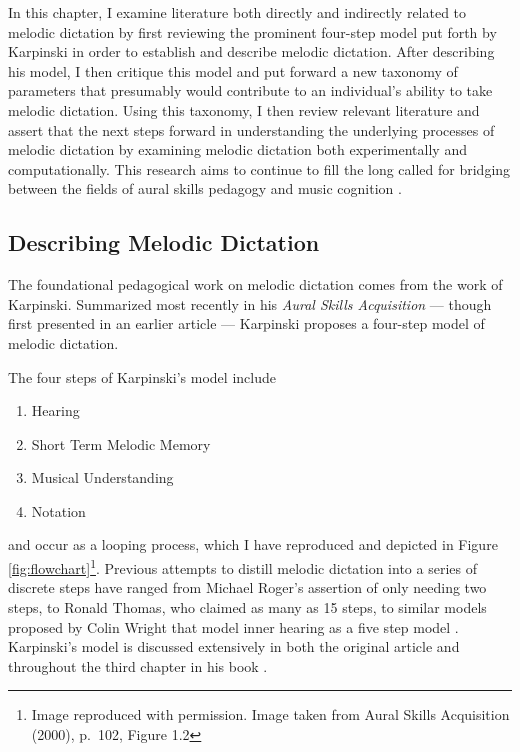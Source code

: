 \documentclass[12pt,]{book}
\providecommand{\tightlist}{%
  \setlength{\itemsep}{0pt}\setlength{\parskip}{0pt}}
\let\rmarkdownfootnote\footnote%
\def\footnote{\protect\rmarkdownfootnote}
\begin{document}
In this chapter, I examine literature both directly and indirectly related to melodic dictation by first reviewing the prominent four-step model put forth by Karpinski in order to establish and describe melodic dictation.
After describing his model, I then critique this model and put forward a new taxonomy of parameters that presumably would contribute to an individual's ability to take melodic dictation.
Using this taxonomy, I then review relevant literature and assert that the next steps forward in understanding the underlying processes of melodic dictation by examining melodic dictation both experimentally and computationally.
This research aims to continue to fill the long called for bridging between the fields of aural skills pedagogy and music cognition \citep{davidbutlerWhyGulfMusic1997a, karpinskiAuralSkillsAcquisition2000, klonoskiPerceptualLearningHierarchy2000}.

\hypertarget{describing-melodic-dictation}{%
\subsection{Describing Melodic Dictation}\label{describing-melodic-dictation}}

The foundational pedagogical work on melodic dictation comes from the work of Karpinski.
Summarized most recently in his \emph{Aural Skills Acquisition} \citep{karpinskiAuralSkillsAcquisition2000}--- though first presented in an earlier article \citep{karpinskiModelMusicPerception1990}--- Karpinski proposes a four-step model of melodic dictation.

The four steps of Karpinski's model include

\begin{enumerate}
\def\labelenumi{\arabic{enumi}.}
\tightlist
\item
  Hearing
\item
  Short Term Melodic Memory
\item
  Musical Understanding
\item
  Notation
\end{enumerate}

and occur as a looping process, which I have reproduced and depicted in Figure \ref{fig:flowchart}\footnote{Image reproduced with permission. Image taken from Aural Skills Acquisition (2000), p.~102, Figure 1.2}.
Previous attempts to distill melodic dictation into a series of discrete steps have ranged from Michael Roger's assertion of only needing two steps, to Ronald Thomas, who claimed as many as 15 steps, to similar models proposed by Colin Wright that model inner hearing as a five step model \citep{wrightInvestigatingAuralCase2016, karpinskiAuralSkillsAcquisition2000}.
Karpinski's model is discussed extensively in both the original article \citep{karpinskiModelMusicPerception1990} and throughout the third chapter in his book \citep{karpinskiAuralSkillsAcquisition2000}.
\end{document}
